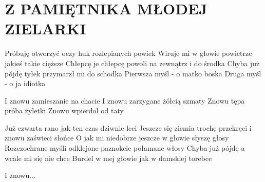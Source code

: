 \documentclass[../../../songbook.tex]{subfiles}
\begin{document}
\TabPositions{8cm} %
\section*{Z PAMIĘTNIKA MŁODEJ ZIELARKI}
{}
\vspace{0.5cm}
Próbuję otworzyć oczy huk rozlepianych powiek		 \newline
Wiruje mi w głowie powietrze jakieś takie cięższe  \newline
Chłepcę je chłepcę powoli na zewnątrz i do środka \newline
Chyba już pójdę tyłek przymarzł mi do schodka \newline
Pierwsza myśl - o matko boska   \newline
Druga myśl - o ja idiotka      \newline

\-\hspace{1cm} I znowu zamieszanie na chacie	 \newline
\-\hspace{1cm} I znowu zarzygane żółcią szmaty	 \newline
\-\hspace{1cm} Znowu tępa próba żyletki		 \newline
\-\hspace{1cm} Znowu wpierdol od taty			 \newline

Już czwarta rano jak ten czas dziwnie leci \newline
Jeszcze się ziemia trochę przekręci i znowu zaświeci słońce \newline
O jak mi niedobrze jeszcze w głowie słyszę głosy \newline
Rozczochrane myśli odklejone paznokcie połamane włosy  \newline
Chyba już pójdę a wcale mi się nie chce \newline
Burdel w mej głowie jak w damskiej torebce \newline

\-\hspace{1cm} I znowu... \newline
\end{document}
